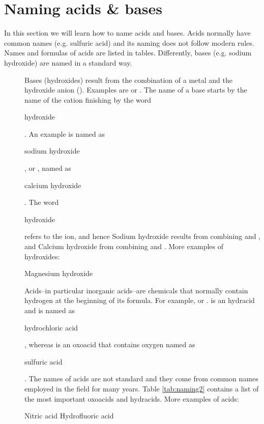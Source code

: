 \documentclass[main.tex]{subfiles}
\begin{document}
\section{Naming acids \& bases}
In this section we will learn how to name acids and bases. Acids normally have common names (e.g. sulfuric acid) and its naming does not follow modern rules. Names and formulas of acids are listed in tables. Differently, bases (e.g. sodium hydroxide) are named in a standard way.\sloppy 
\begin{description}
\item[] Bases (hydroxides) result from the combination of a metal and the hydroxide anion (). Examples are  or . The name of a base starts by the name of the cation finishing by the word \begin{it}hydroxide\end{it}. An example is  named as \begin{it}sodium hydroxide\end{it}, or , named as \begin{it}calcium hydroxide\end{it}. The word  \begin{it}hydroxide\end{it} refers to the  ion, and hence Sodium hydroxide results from combining  and , and Calcium hydroxide from combining  and . More examples of hydroxides:
 \begin{namingbox} {}
  \hfill Magnesium hydroxide\\
\end{namingbox}



\item[] Acids--in particular inorganic acids--are chemicals that normally contain hydrogen at the beginning of its formula. For example,  or .  is an hydracid and is named as \begin{it}hydrochloric acid\end{it}, whereas   is an oxoacid that contains oxygen named as \begin{it}sulfuric acid\end{it}.
The names of acids are not standard and they come from common names employed in the field for many years. Table \ref{tab:naming2} contains a list of the most important oxoacids and hydracids. 
More examples of acids:
 \begin{namingbox} {}
  \hfill Nitric acid\hfill 
    \hfill Hydrofluoric acid\\
\end{namingbox}






\end{description}
\end{document}

